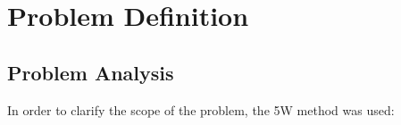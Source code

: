 \documentclass[compsoc]{IEEEtran}
\begin{document}

\newpage
\section{Problem Definition}
\subsection{Problem Analysis}
In order to clarify the scope of the problem, the 5W method was used:
\end{document}
